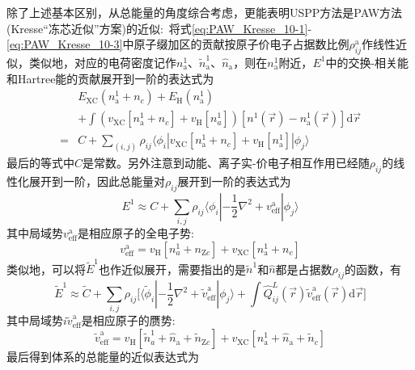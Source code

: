 除了上述基本区别，从总能量的角度综合考虑，更能表明\textrm{USPP}方法是\textrm{PAW}方法(\textrm{Kresse}“冻芯近似”方案)的近似:~将式\eqref{eq:PAW_Kresse_10-1}-\eqref{eq:PAW_Kresse_10-3}中原子缀加区的贡献按原子价电子占据数比例$\rho_{ij}^\mathrm{a}$作线性近似，类似地，对应的电荷密度记作$n_{\mathrm{a}}^1$、$\tilde n_{\mathrm{a}}^1$、$\hat n_{\mathrm{a}}$，则在$n_{\mathrm{a}}^1$附近，$E^1$中的交换-相关能和\textrm{Hartree}能的贡献展开到一阶的表达式为
\begin{displaymath}
	\begin{aligned}
		&E_{\mathrm{XC}}(n^1_{\mathrm{a}}+n_c)+E_{\mathrm{H}}(n_{\mathrm{a}}^1)\\
		&+\int(v_{\mathrm{XC}}[n_{\mathrm{a}}^1+n_c]+v_{\mathrm{H}}[n_a^1])[n^1(\vec r)-n^1_{\mathrm{a}}(\vec r)]\mathrm{d}\vec r\\
		=&C+\sum_{(i,j)}\rho_{ij}\langle\phi_i|v_{\mathrm{XC}}[n_{\mathrm{a}}^1+n_c]+v_{\mathrm{H}}[n_{\mathrm{a}}^1]|\phi_j\rangle
	\end{aligned}
\end{displaymath}
最后的等式中$C$是常数。另外注意到动能、离子实-价电子相互作用已经随$\rho_{ij}$的线性化展开到一阶，因此总能量对$\rho_{ij}$展开到一阶的表达式为
\begin{equation}
		E^1\approx C+\sum_{i,j}\rho_{ij}\langle\phi_i|-\dfrac12\nabla^2+v_{\mathrm{eff}}^{\mathrm a}|\phi_j\rangle
	\label{eq:PAW_Kresse_E1}
\end{equation}
其中局域势$v_{\mathrm{eff}}^{\mathrm a}$是相应原子的全电子势:~
\begin{displaymath}
	v_{\mathrm{eff}}^{\mathrm a}=v_{\mathrm{H}}[n_a^1+n_{\mathrm{Z}c}]+v_{\mathrm{XC}}[n_{\mathrm{a}}^1+n_c]
\end{displaymath}
类似地，可以将$\tilde E^1$也作近似展开，需要指出的是$\tilde n^1$和$\hat n$都是占据数$\rho_{ij}$的函数，有
\begin{equation}
	\tilde E^1\approx\tilde C+\sum_{i,j}\rho_{ij}\bigg[\langle\tilde\phi_i|-\dfrac12\nabla^2+\tilde v_{\mathrm{eff}}^{\mathrm a}|\phi_j\rangle+\int\hat Q_{ij}^L(\vec r)\tilde v_{\mathrm{eff}}^{\mathrm a}(\vec r)\mathrm{d}\vec r \bigg]
	\label{eq:PAW_Kresse_tE1}
\end{equation}
其中局域势$i\tilde v_{\mathrm{eff}}^{\mathrm a}$是相应原子的赝势:~
\begin{displaymath}
	\tilde v_{\mathrm{eff}}^{\mathrm a}=v_{\mathrm{H}}[\tilde n_a^1+\hat n_{\mathrm{a}}+\tilde n_{\mathrm{Z}c}]+v_{\mathrm{XC}}[n_{\mathrm{a}}^1+\hat n_{\mathrm{a}}+\tilde n_c]
\end{displaymath}
最后得到体系的总能量的近似表达式为
